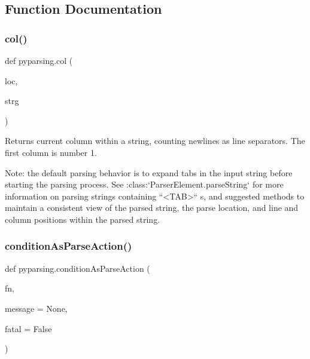 \subsection{Function Documentation}
\mbox{\label{namespacepyparsing_af3e07bff69d7504360e58f40a227ff74}} 
\subsubsection{\texorpdfstring{col()}{col()}}
{\footnotesize\ttfamily def pyparsing.\+col (\begin{DoxyParamCaption}\item[{}]{loc,  }\item[{}]{strg }\end{DoxyParamCaption})}

\begin{DoxyVerb}Returns current column within a string, counting newlines as line separators.
   The first column is number 1.

   Note: the default parsing behavior is to expand tabs in the input string
   before starting the parsing process.  See
   :class:`ParserElement.parseString` for more
   information on parsing strings containing ``<TAB>`` s, and suggested
   methods to maintain a consistent view of the parsed string, the parse
   location, and line and column positions within the parsed string.\end{DoxyVerb}
 \mbox{\label{namespacepyparsing_ade1d8de85fac4306e21a3d31cb366bf3}} 
\subsubsection{\texorpdfstring{condition\+As\+Parse\+Action()}{conditionAsParseAction()}}
{\footnotesize\ttfamily def pyparsing.\+condition\+As\+Parse\+Action (\begin{DoxyParamCaption}\item[{}]{fn,  }\item[{}]{message = {\ttfamily None},  }\item[{}]{fatal = {\ttfamily False} }\end{DoxyParamCaption})}

